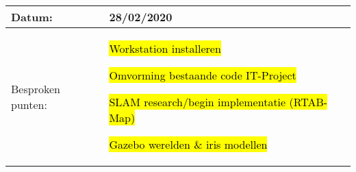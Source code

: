 \begin{tabularx}{\textwidth}{| l | X |}
  \hline
  Datum: & 28/02/2020\\
  \hline
  Besproken punten: &
  \begin{compactitem}
    \item \hl{Workstation installeren}
    \item \hl{Omvorming bestaande code IT-Project}
    \item \hl{SLAM research/begin implementatie (RTAB-Map)}
    \item \hl{Gazebo werelden \& iris modellen}
  \end{compactitem}\\
  \hline
\end{tabularx}